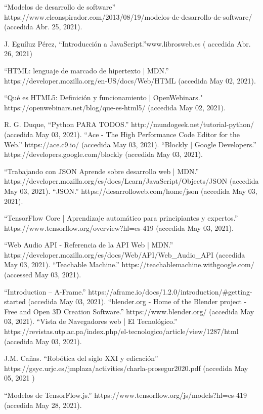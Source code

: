 \begin{thebibliography}{69}
 ``Modelos de desarrollo de software” https://www.elconspirador.com/2013/08/19/modelos-de-desarrollo-de-software/ (accedida Abr. 25, 2021).

 J. Eguíluz Pérez, “Introducción a JavaScript.”www.librosweb.es ( accedida Abr. 26, 2021)


	``HTML: lenguaje de marcado de hipertexto | MDN.” https://developer.mozilla.org/en-US/docs/Web/HTML (accedida May 02, 2021).

 ``Qué es HTML5: Definición y funcionamiento | OpenWebinars." https://openwebinars.net/blog/que-es-html5/ (accedida May 02, 2021).


 R. G. Duque, ``Python PARA TODOS.” http://mundogeek.net/tutorial-python/ (accedida May 03, 2021).
 ``Ace - The High Performance Code Editor for the Web.” https://ace.c9.io/ (accedida May 03, 2021).
 ``Blockly  |  Google Developers.” https://developers.google.com/blockly (accedida May 03, 2021).


 ``Trabajando con JSON \- Aprende sobre desarrollo web | MDN.” https://developer.mozilla.org/es/docs/Learn/JavaScript/Objects/JSON (accedida May 03, 2021).
 ``JSON.” https://desarrolloweb.com/home/json (accedida May 03, 2021).

 ``TensorFlow Core | Aprendizaje automático para principiantes y expertos.” https://www.tensorflow.org/overview?hl=es-419 (accedida May 03, 2021).

 ``Web Audio API - Referencia de la API Web | MDN.” https://developer.mozilla.org/es/docs/Web/API/Web\_Audio\_API (accedida May 03, 2021).
 ``Teachable Machine.” https://teachablemachine.withgoogle.com/ (accessed May 03, 2021).

 ``Introduction – A-Frame.” https://aframe.io/docs/1.2.0/introduction/\#getting-started (accedida May 03, 2021).
  ``blender.org - Home of the Blender project - Free and Open 3D Creation Software.” https://www.blender.org/ (accedida May 03, 2021).
 ``Vista de Navegadores web | El Tecnológico.” https://revistas.utp.ac.pa/index.php/el-tecnologico/article/view/1287/html (accedida May 03, 2021).

 J.M. Cañas.  ``Robótica del siglo XXI y edicación” https://gsyc.urjc.es/jmplaza/activities/charla-prosegur2020.pdf (accedida May 05, 2021 )

 ``Modelos de TensorFlow.js.” https://www.tensorflow.org/js/models?hl=es-419 (accedida May 28, 2021).

\end{thebibliography}
